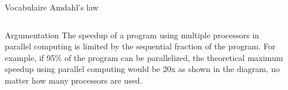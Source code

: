 
\begin{Frame}{Vocabulaire Amdahl's law}
  \begin{columns}[t]
    \begin{column}{\BW} %
      \begin{block}{Argumentation}
        The speedup of a program using multiple processors in parallel
        computing is limited by the sequential fraction of the
        program. For example, if 95\% of the program can be
        parallelized, the theoretical maximum speedup using parallel
        computing would be 20x as shown in the diagram, no matter how
        many processors are used.  
\end{block}
    \end{column}
    
    \begin{column}{\BW} %
      \begin{block}{}
      \end{block}   
    \end{column}
  \end{columns}  
\end{Frame}


